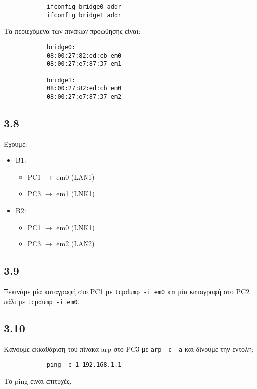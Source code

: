\documentclass[a4paper, 12pt]{article}
\begin{document}
		\begin{verbatim}
			ifconfig bridge0 addr
			ifconfig bridge1 addr
		\end{verbatim}
		
		Τα περιεχόμενα των πινάκων προώθησης είναι:
		
		\begin{verbatim}
			bridge0:
			08:00:27:82:ed:cb em0
			08:00:27:e7:87:37 em1
		
			bridge1:
			08:00:27:82:ed:cb em0
			08:00:27:e7:87:37 em2
		\end{verbatim}
		

	\subsection*{3.8}
		Έχουμε:
		
		\begin{itemize}
			\item B1:
				\begin{itemize}
					\item PC1 $\rightarrow$ em0 (LAN1)
					\item PC3 $\rightarrow$ em1 (LNK1)
				\end{itemize}
			\item B2:
				\begin{itemize}
					\item PC1 $\rightarrow$ em0 (LNK1)
					\item PC3 $\rightarrow$ em2 (LAN2)
				\end{itemize}
		\end{itemize}				

	\subsection*{3.9}
		Ξεκινάμε μία καταγραφή στο PC1 με \verb|tcpdump -i em0| και μία καταγραφή στο PC2 πάλι με \verb|tcpdump -i em0|.

	\subsection*{3.10}
		Κάνουμε εκκαθάριση του πίνακα arp στο PC3 με \verb|arp -d -a| και δίνουμε την εντολή:
		
		\begin{verbatim}
			ping -c 1 192.168.1.1
		\end{verbatim} 
		
		Το ping είναι επιτυχές.
\end{document}
